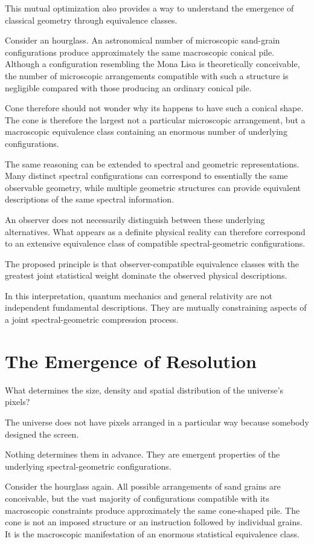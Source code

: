 This mutual optimization also provides a way to understand the emergence of classical geometry through equivalence classes.

Consider an hourglass. An astronomical number of microscopic sand-grain configurations produce approximately the same macroscopic conical pile.
Although a configuration resembling the Mona Lisa is theoretically conceivable, the number of microscopic arrangements compatible with such a
structure is negligible compared with those producing an ordinary conical pile.

Cone therefore should not wonder why its happens to have such a conical shape. The cone is therefore the largest not a particular microscopic arrangement, but a macroscopic equivalence class containing an enormous number of underlying configurations.

The same reasoning can be extended to spectral and geometric representations. Many distinct spectral configurations can correspond to essentially the same observable geometry, while multiple geometric structures can provide equivalent descriptions of the same spectral information.

An observer does not necessarily distinguish between these underlying alternatives. What appears as a definite physical reality can therefore correspond to an extensive equivalence class of compatible spectral-geometric configurations.

The proposed principle is that observer-compatible equivalence classes with the greatest joint statistical weight dominate the observed physical descriptions.

In this interpretation, quantum mechanics and general relativity are not independent fundamental descriptions. They are mutually constraining aspects of a joint spectral-geometric compression process.


\section{The Emergence of Resolution}

What determines the size, density and spatial distribution of the universe's pixels?

The universe does not have pixels arranged in a particular way because somebody designed the screen. 

Nothing determines them in advance. They are emergent properties of the underlying spectral-geometric configurations.

Consider the hourglass again. All possible arrangements of sand grains are conceivable, but the vast majority of configurations compatible with its macroscopic constraints produce approximately the same cone-shaped pile.
The cone is not an imposed structure or an instruction followed by individual grains. It is the macroscopic manifestation of an enormous statistical equivalence class.

